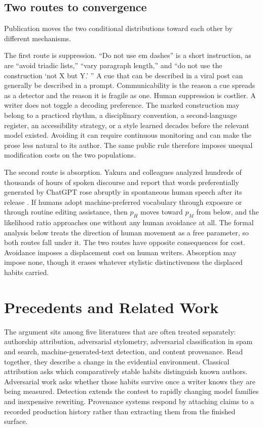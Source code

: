 \documentclass[11pt]{article}
\theoremstyle{plain}
\theoremstyle{definition}
\theoremstyle{remark}
\begin{document}
\subsection{Two routes to convergence}

Publication moves the two conditional distributions toward each other by different mechanisms.

The first route is suppression. ``Do not use em dashes'' is a short instruction, as are ``avoid triadic lists,'' ``vary paragraph length,'' and ``do not use the construction `not X but Y.' '' A cue that can be described in a viral post can generally be described in a prompt. Communicability is the reason a cue spreads as a detector and the reason it is fragile as one. Human suppression is costlier. A writer does not toggle a decoding preference. The marked construction may belong to a practiced rhythm, a disciplinary convention, a second-language register, an accessibility strategy, or a style learned decades before the relevant model existed. Avoiding it can require continuous monitoring and can make the prose less natural to its author. The same public rule therefore imposes unequal modification costs on the two populations.

The second route is absorption. Yakura and colleagues analyzed hundreds of thousands of hours of spoken discourse and report that words preferentially generated by ChatGPT rose abruptly in spontaneous human speech after its release \cite{yakura2025}. If humans adopt machine-preferred vocabulary through exposure or through routine editing assistance, then $p_H$ moves toward $p_M$ from below, and the likelihood ratio approaches one without any human avoidance at all. The formal analysis below treats the direction of human movement as a free parameter, so both routes fall under it. The two routes have opposite consequences for cost. Avoidance imposes a displacement cost on human writers. Absorption may impose none, though it erases whatever stylistic distinctiveness the displaced habits carried.


\section{Precedents and Related Work}\label{sec:precedents}

The argument sits among five literatures that are often treated separately: authorship attribution, adversarial stylometry, adversarial classification in spam and search, machine-generated-text detection, and content provenance. Read together, they describe a change in the evidential environment. Classical attribution asks which comparatively stable habits distinguish known authors. Adversarial work asks whether those habits survive once a writer knows they are being measured. Detection extends the contest to rapidly changing model families and inexpensive rewriting. Provenance systems respond by attaching claims to a recorded production history rather than extracting them from the finished surface.
\end{document}
